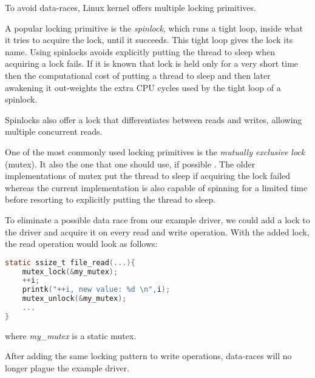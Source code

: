 \documentclass[..thesis.tex]{subfiles}
\begin{document}
To avoid data-races, Linux kernel offers multiple locking primitives. 

A popular locking primitive is the \textit{spinlock}, which runs a tight loop, inside what it tries to acquire the lock, until it succeeds. This tight loop gives the lock its name. Using spinlocks avoids explicitly putting the thread to sleep when acquiring a lock fails. If it is known that lock is held only for a very short time then the computational cost of putting a thread to sleep and then later awakening it out-weights the extra CPU cycles used by the tight loop of a spinlock.

Spinlocks also offer a lock that differentiates between reads and writes, allowing multiple concurrent reads.

One of the most commonly used locking primitives is the \textit{mutually exclusive lock} (mutex). It also the one that one should use, if possible \cite[Documentation/locking/mutex-design.txt]{torvalds_linux}. The older implementations of mutex put the thread to sleep if acquiring the lock failed whereas the current implementation is also capable of spinning for a limited time before resorting to explicitly putting the thread to sleep.


To eliminate a possible data race from our example driver, we could add a lock to the driver and acquire it on every read and write operation. With the added lock, the read operation would look as follows:

\begin{lstlisting}[language=C,style=def]
static ssize_t file_read(...){
    mutex_lock(&my_mutex);
    ++i;
    printk("++i, new value: %d \n",i);
    mutex_unlock(&my_mutex);
    ...
}
\end{lstlisting}

where \textit{my\_mutex} is a static mutex.

After adding the same locking pattern to write operations, data-races will no longer plague the example driver.

\end{document}
